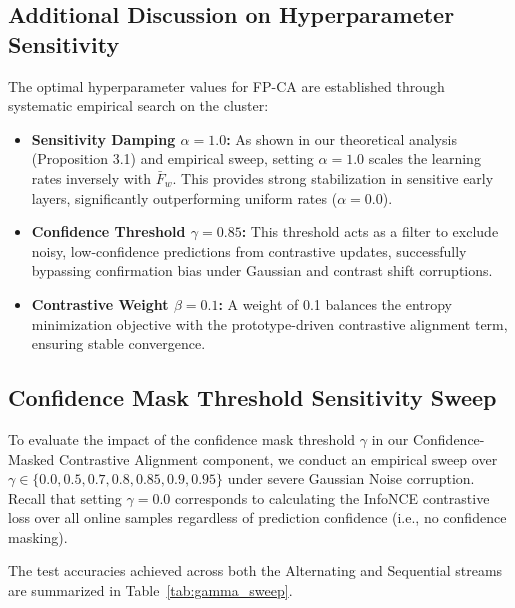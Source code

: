 \documentclass{article}
\theoremstyle{plain}
\theoremstyle{definition}
\theoremstyle{remark}
\begin{document}
\subsection{Additional Discussion on Hyperparameter Sensitivity}
The optimal hyperparameter values for FP-CA are established through systematic empirical search on the cluster:
\begin{itemize}
  \item \textbf{Sensitivity Damping $\alpha = 1.0$:} As shown in our theoretical analysis (Proposition 3.1) and empirical sweep, setting $\alpha = 1.0$ scales the learning rates inversely with $\bar{F}_w$. This provides strong stabilization in sensitive early layers, significantly outperforming uniform rates ($\alpha = 0.0$).
  \item \textbf{Confidence Threshold $\gamma = 0.85$:} This threshold acts as a filter to exclude noisy, low-confidence predictions from contrastive updates, successfully bypassing confirmation bias under Gaussian and contrast shift corruptions.
  \item \textbf{Contrastive Weight $\beta = 0.1$:} A weight of 0.1 balances the entropy minimization objective with the prototype-driven contrastive alignment term, ensuring stable convergence.
\end{itemize}

\subsection{Confidence Mask Threshold Sensitivity Sweep}
To evaluate the impact of the confidence mask threshold $\gamma$ in our Confidence-Masked Contrastive Alignment component, we conduct an empirical sweep over $\gamma \in \{0.0, 0.5, 0.7, 0.8, 0.85, 0.9, 0.95\}$ under severe Gaussian Noise corruption. Recall that setting $\gamma = 0.0$ corresponds to calculating the InfoNCE contrastive loss over all online samples regardless of prediction confidence (i.e., no confidence masking).

The test accuracies achieved across both the Alternating and Sequential streams are summarized in Table~\ref{tab:gamma_sweep}.
\end{document}
